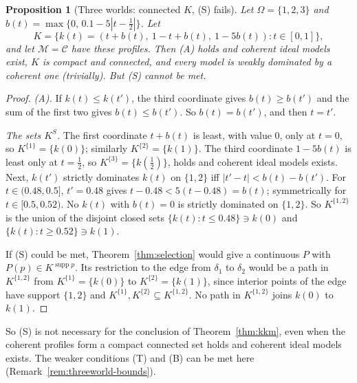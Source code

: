 \documentclass[11pt]{article}
\newtheorem{proposition}[theorem]{Proposition}
\theoremstyle{definition}
\theoremstyle{remark}
\newcommand{\M}{\mathcal M}
\newcommand{\C}{\mathcal C}
\newcommand{\supp}{\operatorname{supp}}
\begin{document}
\begin{proposition}[Three worlds: connected $K$, (S) fails]\label{prop:threeworld}
Let $\Omega=\{1,2,3\}$ and $b(t)=\max\{0,\,0.1-5|t-\tfrac12|\}$. Let
\[
 K=\{k(t)=(t+b(t),\ 1-t+b(t),\ 1-5b(t)):t\in[0,1]\},
\]
and let $\M=\C$ have these profiles. Then (A) holds and coherent ideal models exist, $K$ is compact and connected, and every model is weakly dominated by a coherent one (trivially). But (S) cannot be met.
\end{proposition}
\begin{proof}
\emph{(A).} If $k(t)\le k(t')$, the third coordinate gives $b(t)\ge b(t')$ and the sum of the first two gives $b(t)\le b(t')$. So $b(t)=b(t')$, and then $t=t'$.

\emph{The sets $K^S$.} The first coordinate $t+b(t)$ is least, with value $0$, only at $t=0$, so $K^{\{1\}}=\{k(0)\}$; similarly $K^{\{2\}}=\{k(1)\}$. The third coordinate $1-5b(t)$ is least only at $t=\tfrac12$, so $K^{\{3\}}=\{k(\tfrac12)\}$, holds and coherent ideal models exists. Next, $k(t')$ strictly dominates $k(t)$ on $\{1,2\}$ iff $|t'-t|<b(t)-b(t')$. For $t\in(0.48,0.5]$, $t'=0.48$ gives $t-0.48<5(t-0.48)=b(t)$; symmetrically for $t\in[0.5,0.52)$. No $k(t)$ with $b(t)=0$ is strictly dominated on $\{1,2\}$. So $K^{\{1,2\}}$ is the union of the disjoint closed sets $\{k(t):t\le0.48\}\ni k(0)$ and $\{k(t):t\ge0.52\}\ni k(1)$.

If (S) could be met, Theorem~\ref{thm:selection} would give a continuous $P$ with $P(p)\in K^{\supp p}$. Its restriction to the edge from $\delta_1$ to $\delta_2$ would be a path in $K^{\{1,2\}}$ from $K^{\{1\}}=\{k(0)\}$ to $K^{\{2\}}=\{k(1)\}$, since interior points of the edge have support $\{1,2\}$ and $K^{\{1\}},K^{\{2\}}\subseteq K^{\{1,2\}}$. No path in $K^{\{1,2\}}$ joins $k(0)$ to $k(1)$.
\end{proof}
So (S) is not necessary for the conclusion of Theorem~\ref{thm:kkm}, even when the coherent profiles form a compact connected set holds and coherent ideal models exists. The weaker conditions (T) and (B) can be met here (Remark~\ref{rem:threeworld-bounds}).
\end{document}
